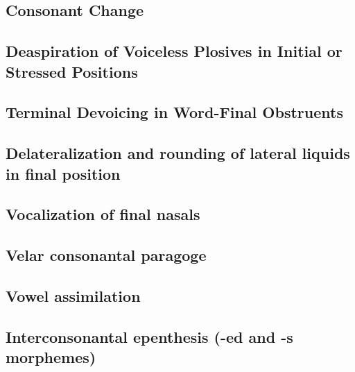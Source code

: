 \subsection{Consonant Change}
\subsection{Deaspiration of Voiceless Plosives in Initial or Stressed Positions}
\subsection{Terminal Devoicing in Word-Final Obstruents}
\subsection{Delateralization and rounding of lateral liquids in final position}
\subsection{Vocalization of final nasals}
\subsection{Velar consonantal paragoge}
\subsection{Vowel assimilation}
\subsection{Interconsonantal epenthesis (-ed and -s morphemes)}






